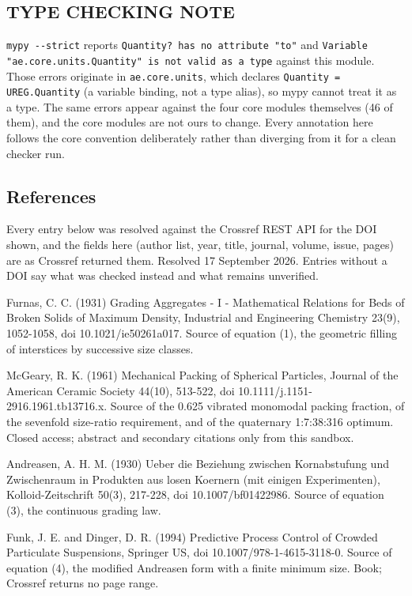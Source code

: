 \documentclass[10pt,a4paper,twoside]{report}
\begin{document}
\subsection*{TYPE CHECKING NOTE}

\texttt{mypy -{}-strict} reports \texttt{Quantity? has no attribute "to"} and \texttt{Variable "ae.core.units.Quantity" is not valid as a type} against this module. Those errors originate in \texttt{ae.core.units}, which declares \texttt{Quantity = UREG.Quantity} (a variable binding, not a type alias), so mypy cannot treat it as a type. The same errors appear against the four core modules themselves (46 of them), and the core modules are not ours to change. Every annotation here follows the core convention deliberately rather than diverging from it for a clean checker run.

\subsection*{References}

Every entry below was resolved against the Crossref REST API for the DOI shown, and the fields here (author list, year, title, journal, volume, issue, pages) are as Crossref returned them. Resolved 17 September 2026. Entries without a DOI say what was checked instead and what remains unverified.

Furnas, C. C. (1931) Grading Aggregates - I - Mathematical Relations for Beds of Broken Solids of Maximum Density, Industrial and Engineering Chemistry 23(9), 1052-1058, doi 10.1021/ie50261a017. Source of equation (1), the geometric filling of interstices by successive size classes.

McGeary, R. K. (1961) Mechanical Packing of Spherical Particles, Journal of the American Ceramic Society 44(10), 513-522, doi 10.1111/j.1151-2916.1961.tb13716.x. Source of the 0.625 vibrated monomodal packing fraction, of the sevenfold size-ratio requirement, and of the quaternary 1:7:38:316 optimum. Closed access; abstract and secondary citations only from this sandbox.

Andreasen, A. H. M. (1930) Ueber die Beziehung zwischen Kornabstufung und Zwischenraum in Produkten aus losen Koernern (mit einigen Experimenten), Kolloid-Zeitschrift 50(3), 217-228, doi 10.1007/bf01422986. Source of equation (3), the continuous grading law.

Funk, J. E. and Dinger, D. R. (1994) Predictive Process Control of Crowded Particulate Suspensions, Springer US, doi 10.1007/978-1-4615-3118-0. Source of equation (4), the modified Andreasen form with a finite minimum size. Book; Crossref returns no page range.
\end{document}
